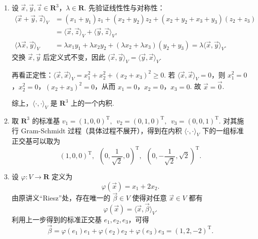 \documentclass[12pt,fontset=fandol]{ctexart}
\begin{document}
\begin{solve}
\begin{enumerate}
        \item 设 $\vec{x}, \vec{y}, \vec{z} \in \mathbf{R}^3$，$\lambda \in \mathbf{R}$. 先验证线性性与对称性：
        \begin{align*}
            \langle \vec{x} + \vec{y}, \vec{z} \rangle_V
             & = (x_1 + y_1)z_1 + (x_2 + y_2)z_2 + (x_2 + y_2 + x_3 + y_3)(z_2 + z_3) \\
             & = \langle \vec{x}, \vec{z} \rangle_V + \langle \vec{y}, \vec{z} \rangle_V, \\
            \langle \lambda \vec{x}, \vec{y} \rangle_V
             & = \lambda x_1 y_1 + \lambda x_2 y_2 + (\lambda x_2 + \lambda x_3)(y_2 + y_3)
            = \lambda \langle \vec{x}, \vec{y} \rangle_V.
        \end{align*}
        交换 $\vec{x}, \vec{y}$ 后定义式不变，因此 $\langle \vec{x}, \vec{y} \rangle_V = \langle \vec{y}, \vec{x} \rangle_V$.

        再看正定性：$\langle \vec{x}, \vec{x} \rangle_V = x_1^2 + x_2^2 + (x_2 + x_3)^2 \geqslant 0$. 若 $\langle \vec{x}, \vec{x} \rangle_V = 0$，则 $x_1^2 = 0$，$x_2^2 = 0$，$(x_2 + x_3)^2 = 0$，从而 $x_1 = 0$，$x_2 = 0$，$x_3 = 0$. 故 $\vec{x} = \vec{0}$.

        综上，$\langle \cdot, \cdot \rangle_V$ 是 $\mathbf{R}^3$ 上的一个内积.

        \item 取 $\mathbf{R}^3$ 的标准基 $v_1 = (1, 0, 0)^{\mathrm{T}}, \enspace v_2 = (0, 1, 0)^{\mathrm{T}}, \enspace v_3 = (0, 0, 1)^{\mathrm{T}}$.
        对其施行 Gram-Schmidt 过程（具体过程不展开），得到在内积 $\langle \cdot, \cdot \rangle_V$ 下的一组标准正交基可以取为
        \[
            \left(1, 0, 0\right)^{\mathrm{T}}, \enspace \left(0, \frac{1}{\sqrt{2}}, 0\right)^{\mathrm{T}}, \enspace \left(0, -\frac{1}{\sqrt{2}}, \sqrt{2}\right)^{\mathrm{T}}.
        \]

        \item 设 $\varphi \colon V \to \mathbf{R}$ 定义为
        \[
            \varphi(\vec{x}) = x_1 + 2x_2.
        \]
        由原讲义“Riesz”处，存在唯一的 $\vec{\beta} \in V$ 使得对任意 $\vec{x} \in V$ 都有
        \[
            \varphi(\vec{x}) = \langle \vec{x}, \vec{\beta} \rangle_V.
        \]
        利用上一步得到的标准正交基 $e_1, e_2, e_3$，可得
        \[
            \vec{\beta} = \varphi(e_1)e_1 + \varphi(e_2)e_2 + \varphi(e_3)e_3 = (1, 2, -2)^{\mathrm{T}}.
        \]
    \end{enumerate}
\end{solve}
\end{document}
